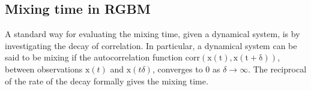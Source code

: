 \documentclass[11pt]{article}
\numberwithin{equation}{section}
\begin{document}










\subsection{Mixing time in RGBM}

A standard way for evaluating the mixing time, given a dynamical system, is by investigating the decay of correlation. In particular, a dynamical system can be said to be mixing if the autocorrelation function $\mathrm{corr(\mathrm{x}(t), \mathrm{x}(t+\delta))}$, between observations $\mathrm{x}(t)$ and $\mathrm{x}(t\delta)$,  converges to $0$ as $\delta \to \infty$.
The reciprocal of the rate of the decay formally gives the mixing time.
\end{document}
